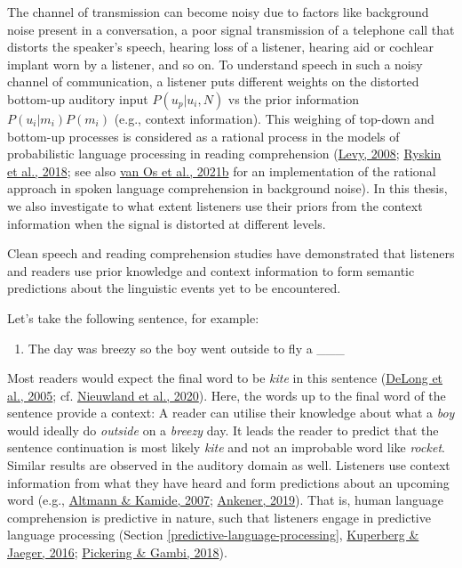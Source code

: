 \documentclass[a4paper, nobind]{templates/ociamthesis}
\providecommand{\tightlist}{%
  \setlength{\itemsep}{0pt}\setlength{\parskip}{0pt}}
\begin{document}
The channel of transmission can become noisy due to factors like background noise present in a conversation,
a poor signal transmission of a telephone call that distorts the speaker's speech,
hearing loss of a listener,
hearing aid or cochlear implant worn by a listener, and so on.
To understand speech in such a noisy channel of communication, a listener puts different weights on the distorted bottom-up auditory input \(P(u_p|u_i, N)\) vs the prior information \(P(u_i|m_i)P(m_i)\) (e.g., context information).
This weighing of top-down and bottom-up processes is considered as a rational process in the models of probabilistic language processing in reading comprehension (\protect\hyperlink{ref-Levy2008}{Levy, 2008}; \protect\hyperlink{ref-Ryskin2018}{Ryskin et al., 2018}; see also \protect\hyperlink{ref-vanOs2021}{van Os et al., 2021b} for an implementation of the rational approach in spoken language comprehension in background noise).
In this thesis, we also investigate to what extent listeners use their priors from the context information when the signal is distorted at different levels.

Clean speech and reading comprehension studies have demonstrated that listeners and readers use prior knowledge and context information to form semantic predictions about the linguistic events yet to be encountered.

Let's take the following sentence, for example:

\begin{enumerate}
\def\labelenumi{(\arabic{enumi})}
\tightlist
\item
  The day was breezy so the boy went outside to fly a \_\_\_\label{kite}
\end{enumerate}

Most readers would expect the final word to be \emph{kite} in this sentence (\protect\hyperlink{ref-Delong2005}{DeLong et al., 2005}; cf. \protect\hyperlink{ref-Nieuwland2020a}{Nieuwland et al., 2020}). Here, the words up to the final word of the sentence provide a context:
A reader can utilise their knowledge about what a \emph{boy} would ideally do \emph{outside} on a \emph{breezy} day.
It leads the reader to predict that the sentence continuation is most likely \emph{kite} and not an improbable word like \emph{rocket}.
Similar results are observed in the auditory domain as well.
Listeners use context information from what they have heard and form predictions about an upcoming word (e.g., \protect\hyperlink{ref-Altmann2007}{Altmann \& Kamide, 2007}; \protect\hyperlink{ref-Ankener2019}{Ankener, 2019}).
That is, human language comprehension is predictive in nature, such that listeners engage in predictive language processing (Section \ref{predictive-language-processing}, \protect\hyperlink{ref-Kuperberg2016}{Kuperberg \& Jaeger, 2016}; \protect\hyperlink{ref-Pickering2018}{Pickering \& Gambi, 2018}).
\end{document}

